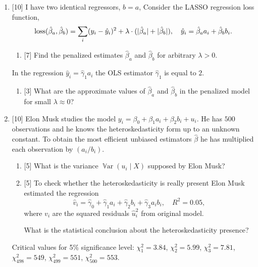 \documentclass[12pt]{article}
\DeclareMathOperator{\Var}{\mathbb{V}ar}
\DeclareMathOperator{\loss}{loss}
\newcommand{\hb}{\hat{\beta}}
\DeclarePairedDelimiter{\abs}{\lvert}{\rvert}
\begin{document}
\begin{enumerate}
    \item {[10]} I have two identical regressors, $b = a$, 
    Consider the LASSO regression loss function,  
    \[
    \loss(\hb_a, \hb_b) = \sum_i (y_i - \hat y_i)^2 + \lambda \cdot (\abs{\hb_a} + \abs{\hb_b}), \quad \hat y_i = \hb_a a_i + \hb_b b_i.
    \] 
    \begin{enumerate}
        \item {[7]} Find the penalized estimates $\hb_a$ and $\hb_b$ for arbitrary $\lambda > 0$.
    \end{enumerate}
    In the regression $\hat y_i = \hat\gamma_1 a_i$ the OLS estimator $\hat\gamma_1$ is equal to $2$.
    \begin{enumerate}[resume]
        \item {[3]} What are the approximate values of $\hb_a$ and $\hb_b$ in the penalized model for small $\lambda \approx 0$?
    \end{enumerate}
    
    \item {[10]} Elon Musk studies the model $y_i = \beta_0 + \beta_1 a_i + \beta_2 b_i + u_i$.
    He has $500$ observations and he knows the heteroskedasticity form up to an unknown constant.
    To obtain the most efficient unbiased estimators $\hb$ he has multiplied each observation by $(a_i / b_i)$. 

    \begin{enumerate}
        \item {[5]} What is the variance $\Var(u_i \mid X)$ supposed by Elon Musk?
        \item {[5]} To check whether the heteroskedasticity is really present Elon Musk estimated the regression 
        \[
        \hat v_i = \hat \gamma_0 + \hat\gamma_1 a_i + \hat\gamma_2 b_i + \hat\gamma_3 a_i b_i, \quad R^2 = 0.05,
        \]
        where $v_i$ are the squared residuals $\hat u_i^2$ from original model. 

       What is the statistical conclusion about the heteroskedasticity presence?
    \end{enumerate}

    Critical values for 5\% significance level: $\chi^2_1 = 3.84$, $\chi^2_2= 5.99$, $\chi^2_3=7.81$, $\chi^2_{498} = 549$, $\chi^2_{499} = 551$, $\chi^2_{500} = 553$.



\end{enumerate}
\end{document}
